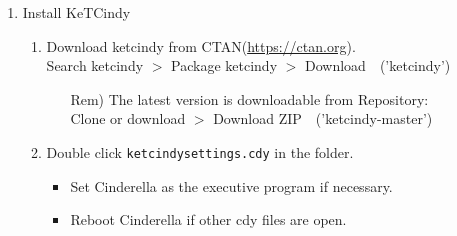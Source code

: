 \documentclass{article}
\begin{document}
\begin{enumerate}[\bf\large 1.]
\item Install KeTCindy
  \begin{enumerate}[(1)]
  \item Download ketcindy from CTAN(\url{https://ctan.org}).\\
  \hspace*{10mm}Search ketcindy $>$ Pack­age ketcindy $>$ Download\ \ ('ketcindy')
    \begin{itemize}
    \item[Rem)]The latest version is downloadable from Repository:\\
         \hspace*{5mm}Clone or download $>$ Download ZIP\ \ ('ketcindy-master')
    \end{itemize}
  \item Double click \verb|ketcindysettings.cdy| in the folder.
    \begin{itemize}
    \item Set Cinderella as the executive program if necessary.
    \item Reboot Cinderella if other cdy files are open.
   \end{itemize}

\vspace{2mm}


\end{enumerate}
\end{enumerate}
\end{document}
